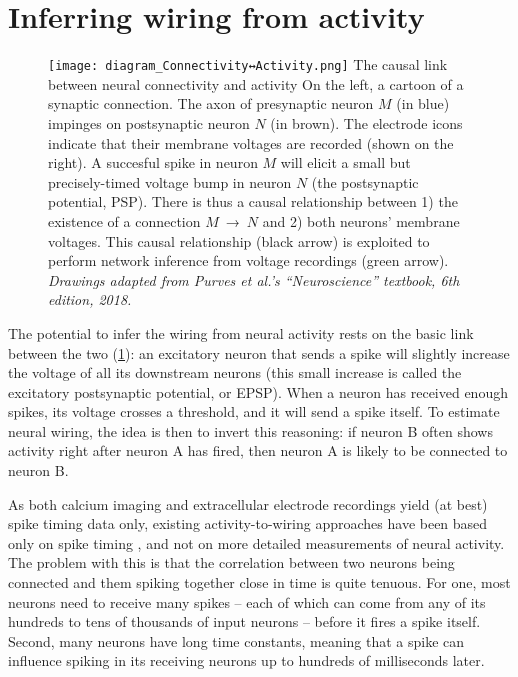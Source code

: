 \section{Inferring wiring from activity}

\begin{figure}
    \vspace*{2em}  %
    \hspace*{-2.5em}
    \texttt{[image: diagram\_Connectivity↔Activity.png]}
    \captionn
        {The causal link between neural connectivity and activity}
        {On the left, a cartoon of a synaptic connection. The axon of presynaptic neuron $M$ (in blue) impinges on postsynaptic neuron $N$ (in brown). The electrode icons indicate that their membrane voltages are recorded (shown on the right).
        A succesful spike in neuron $M$ will elicit a small but precisely-timed voltage bump in neuron $N$ (the postsynaptic potential, PSP).
        There is thus a causal relationship between 1) the existence of a connection $M$~→~$N$ and 2) both neurons' membrane voltages. This causal relationship (black arrow) is exploited to perform network inference from voltage recordings (green arrow).\newline
        \small{\emph{Drawings adapted from Purves et al.'s ``Neuroscience'' textbook, 6th edition, 2018.}}}
    \label{fig:diagram_Connectivity-Activity}
\end{figure}

The potential to infer the wiring from neural activity rests on the basic link between the two (\cref{fig:diagram_Connectivity-Activity}): an excitatory neuron that sends a spike will slightly increase the voltage of all its downstream neurons (this small increase is called the excitatory postsynaptic potential, or EPSP). When a neuron has received enough spikes, its voltage crosses a threshold, and it will send a spike itself. To estimate neural wiring, the idea is then to invert this reasoning: if neuron B often shows activity right after neuron A has fired, then neuron A is likely to be connected to neuron B.

As both calcium imaging and extracellular electrode recordings yield (at best) spike timing data only, existing activity-to-wiring approaches have been based only on spike timing \cite{MagransdeAbril2018ConnectivityInferenceNeural,Casadiego2018InferringNetworkConnectivity,Das2020SystematicErrorsConnectivity}, and not on more detailed measurements of neural activity. The problem with this is that the correlation between two neurons being connected and them spiking together close in time is quite tenuous. For one, most neurons need to receive many spikes – each of which can come from any of its hundreds to tens of thousands of input neurons – before it fires a spike itself. Second, many neurons have long time constants, meaning that a spike can influence spiking in its receiving neurons up to hundreds of milliseconds later.

